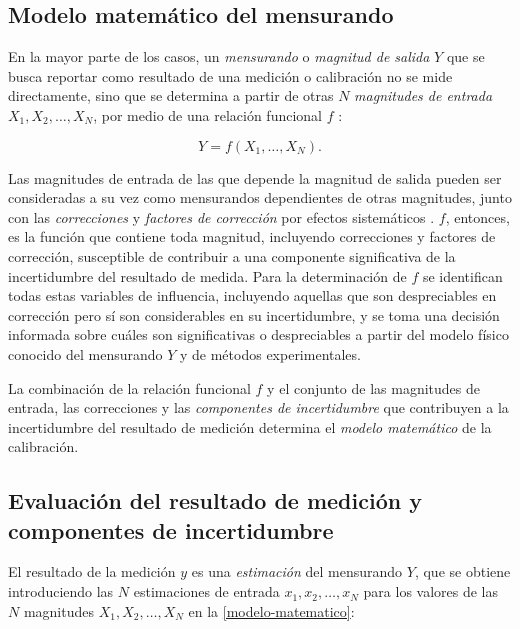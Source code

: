 

\subsection{Modelo matemático del mensurando}

En la mayor parte de los casos, un \textit{mensurando} o \textit{magnitud de salida} $Y$ que se busca reportar como resultado de una medición o calibración no se mide directamente, sino que se determina a partir de otras $N$ \textit{magnitudes de entrada} $X_1, X_2, \ldots, X_N$, por medio de una relación funcional $f$ \cite{GUM4.1}:

\begin{equation}
    Y = f(X_1, \ldots, X_N).
    \label{modelo-matematico}    
\end{equation}


Las magnitudes de entrada de las que depende la magnitud de salida pueden ser consideradas a su vez como mensurandos dependientes de otras magnitudes, junto con las \textit{correcciones} y \textit{factores de corrección} por efectos sistemáticos \cite{GUM4.1}. $f$, entonces, es la función que contiene toda magnitud, incluyendo correcciones y factores de corrección, susceptible de contribuir a una componente significativa de la incertidumbre del resultado de medida. Para la determinación de $f$ se identifican todas estas variables de influencia, incluyendo aquellas que son despreciables en corrección pero sí son considerables en su incertidumbre, y se toma una decisión informada sobre cuáles son significativas o despreciables a partir del modelo físico conocido del mensurando $Y$ y de métodos experimentales.

La combinación de la relación funcional $f$ y el conjunto de las magnitudes de entrada, las correcciones y las \textit{componentes de incertidumbre} que contribuyen a la incertidumbre del resultado de medición determina el \textit{modelo matemático} de la calibración.

\subsection{Evaluación del resultado de medición y componentes de incertidumbre}

El resultado de la medición $y$ es una \textit{estimación} del mensurando $Y$, que se obtiene introduciendo las $N$ estimaciones de entrada $x_1, x_2, \ldots, x_N$ para los valores de las $N$ magnitudes $X_1, X_2, \ldots, X_N$ en la \cref{modelo-matematico}\cite{GUM4.1}:

